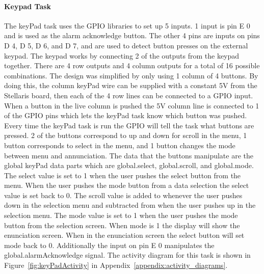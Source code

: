 \documentclass[12pt]{article} %
\begin{document}
    
    \paragraph{Keypad Task} The keyPad task uses the GPIO libraries to set up 5
    inputs. 1 input is pin E 0 and is used as the alarm acknowledge button. The
    other 4 pins are inputs on pins D 4, D 5, D 6, and D 7, and are used to
    detect button presses on the external keypad. The keypad works by
    connecting 2 of the outputs from the keypad together. There are 4 row
    outputs and 4 column outputs for a total of 16 possible combinations. The
    design was simplified by only using 1 column of 4 buttons. By doing this,
    the column keyPad wire can be supplied with a constant 5V from the
    Stellaris board, then each of the 4 row lines can be connected to a GPIO
    input. When a button in the live column is pushed the 5V column line is
    connected to 1 of the GPIO pins which lets the keyPad task know which
    button was pushed. Every time the keyPad task is run the GPIO will tell the
    task what buttons are pressed. 2 of the buttons correspond to up and down
    for scroll in the menu, 1 button corresponds to select in the menu, and 1
    button changes the mode between menu and annunciation. The data that the
    buttons manipulate are the global keyPad data parts which are
    global.select, global.scroll, and global.mode. The select value is set to 1 when the user pushes the select button from the menu. 
When the user pushes the mode button from a data selection the select value is set back to 0. 
The scroll value is added to whenever the user pushes down in the selection menu and subtracted from when the user pushes up in the selection menu.
The mode value is set to 1 when the user pushes the mode button from the selection screen. When mode is 1 the display will show the enunciation screen. 
When in the enunciation screen the select button will set mode back to 0.
Additionally the input on pin
    E 0 manipulates the global.alarmAcknowledge signal. The activity diagram
    for this task is shown in Figure~\ref{fig:keyPadActivity} in Appendix~\ref{appendix:activity_diagrams}.
\end{document}
